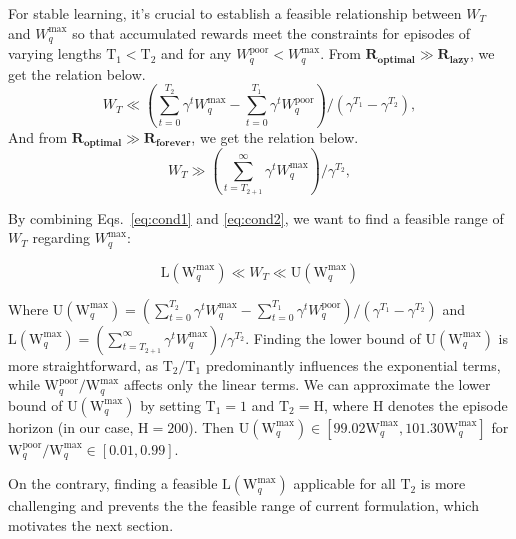 For stable learning, it's crucial to establish a feasible relationship between \(W_T\) and \(W_q^{\max}\) so that accumulated rewards meet the constraints for episodes of varying lengths \(\text{T}_1 < \text{T}_2\) and for any \(W_q^{\text{poor}} < W_q^{\text{max}}\). From $\textbf{R}_{\textbf{optimal}} \gg \textbf{R}_{\textbf{lazy}}$, we get the relation below.
\begin{equation}
W_T \ll (\sum_{t=0}^{T_2} \gamma^t W_q^{\text{max}} - \sum_{t=0}^{T_1} \gamma^t W_q^{\text{poor}})/(\gamma^{T_1} - \gamma^{T_2}), 
\label{eq:cond1}
\end{equation}
And from $\textbf{R}_{\textbf{optimal}} \gg \textbf{R}_{\textbf{forever}}$, we get the relation below.
\begin{equation}
W_T \gg (\sum_{t=T_{2+1}}^{\infty} \gamma^t W_q^{\text{max}})/\gamma^{T_2} ,
\label{eq:cond2}
\end{equation}






By combining Eqs.~\ref{eq:cond1} and \ref{eq:cond2}, we want to find a feasible range of $W_T$ regarding $W_q^{\text{max}}$:






\begin{equation}
\text{L}(\text{W}_q^{\text{max}}) \ll W_T \ll \text{U}(\text{W}_q^{\text{max}})
\label{eq:cond3}
\end{equation}


Where $\text{U}(\text{W}_q^{\text{max}}) = (\sum_{t=0}^{T_2} \gamma^t W_q^{\text{max}} - \sum_{t=0}^{T_1} \gamma^t W_q^{\text{poor}})/(\gamma^{T_1} - \gamma^{T_2})$ and $\text{L}(\text{W}_q^{\text{max}}) = (\sum_{t=T_{2+1}}^{\infty} \gamma^t W_q^{\text{max}})/\gamma^{T_2}$.
Finding the lower bound of $\text{U}(\text{W}_q^{\text{max}})$ is more straightforward, as $\text{T}_2/\text{T}_1$ predominantly influences the exponential terms, while $\text{W}_q^{\text{poor}}/\text{W}_q^{\text{max}}$ affects only the linear terms.
We can approximate the lower bound of $\text{U}(\text{W}_q^{\text{max}})$ by setting $\text{T}_1 = 1$ and $\text{T}_2 = \text{H}$, where $\text{H}$ denotes the episode horizon (in our case, $\text{H} = 200$). Then $\text{U}(\text{W}_q^{\text{max}}) \in [99.02\text{W}_q^{\text{max}}, 101.30\text{W}_q^{\text{max}}]$ for $\text{W}_q^{\text{poor}}/\text{W}_q^{\text{max}} \in [0.01, 0.99]$. 


On the contrary, finding a feasible $\text{L}(\text{W}_q^{\text{max}})$ applicable for all $\text{T}_2$ is more challenging and prevents the the feasible range of current formulation, which motivates the next section.





